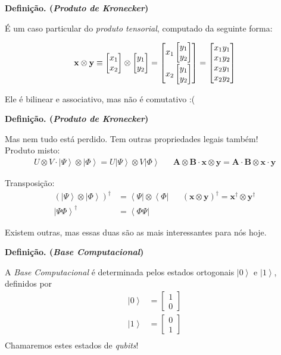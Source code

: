 \documentclass[t]{beamer}
\newcommand{\definicao}[1]{%
	\textbf{Definição. (\emph{#1})\\}
}
\newcommand{\vetor}[2]{\ensuremath{
\left[\begin{matrix}
#1 \\
#2
\end{matrix}\right]
}
}
\newcommand{\vetorx}[4]{\ensuremath{
\left[\begin{matrix}
#1 \\
#2 \\
#3 \\
#4
\end{matrix}\right]
}
}
\newcommand{\ket}[1]{\ensuremath{\left|#1\right\rangle}}
\newcommand{\bra}[1]{\ensuremath{\left\langle#1\right|}}
\begin{document}
	\begin{frame}{\subsecname}
		\definicao{Produto de Kronecker}
		
		É um caso particular do \emph{produto tensorial}, computado da seguinte forma:
		
		\begin{align*}
		\mathbf{x} \otimes \mathbf{y} \equiv \vetor{x_1}{x_2} \otimes \vetor{y_1}{y_2} = \vetor{x_1 \vetor{y_1}{y_2} \vspace{2pt}}{x_2 \vetor{y_1}{y_2}} = \vetorx{x_1 y_1}{x_1 y_2}{x_2 y_1 }{x_2 y_2}
		\end{align*}
		
		Ele é bilinear e associativo, mas não é comutativo :(\\
	\end{frame}
	
	\begin{frame}{\subsecname}
		\definicao{Produto de Kronecker}
		
		Mas nem tudo está perdido. Tem outras propriedades legais também!\\
		
		Produto misto:
		\begin{align*}
			U \otimes V \cdot \ket{\Psi} \otimes \ket{\Phi} = U \ket{\Psi} \otimes V \ket{\Phi} && \mathbf{A} \otimes \mathbf{B} \cdot \mathbf{x} \otimes \mathbf{y} = \mathbf{A} \cdot \mathbf{B} \otimes \mathbf{x} \cdot \mathbf{y}
		\end{align*}
		
		Transposição:
		\begin{align*}
			(\ket{\Psi} \otimes \ket{\Phi})^\dagger &= \bra{\Psi} \otimes \bra{\Phi} && (\mathbf{x} \otimes \mathbf{y})^\dagger = \mathbf{x}^\dagger \otimes \mathbf{y}^\dagger\\
			\ket{\Psi\Phi}^\dagger &= \bra{\Phi\Psi} &&
		\end{align*}
		
		Existem outras, mas essas duas são as mais interessantes para nós hoje.
	\end{frame}
	
	\begin{frame}{\subsecname}
		\definicao{Base Computacional}
		A \emph{Base Computacional} é determinada pelos estados ortogonais $\ket{0}$ e $\ket{1}$, definidos por
		\begin{align*}
		\ket{0} &= \vetor{1}{0}\\
		\ket{1} &= \vetor{0}{1}\\
		\end{align*}
		Chamaremos estes estados de \textit{qubits}!
	\end{frame}
	
\end{document}
